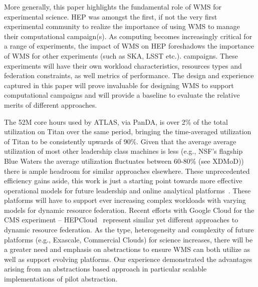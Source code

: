 More generally, this paper highlights the fundamental role of WMS for
experimental science. HEP was amongst the first, if not the very first
experimental community to realize the importance of using WMS to manage their
computational campaign(s). As computing becomes increasingly critical for a
range of experiments, the impact of WMS on HEP foreshadows the importance of
WMS for other experiments (such as SKA, LSST etc.). %
campaigns. These experiments will have their own workload characteristics,
resources types and federation constraints, as well metrics of performance.
The design and experience captured in this paper will prove invaluable for
designing WMS to support computational campaigns and will provide a baseline
to evaluate the relative merits of different approaches.

The 52M core hours used by ATLAS, via PanDA, is over 2\% of the total
utilization on Titan over the same period, bringing the time-averaged
utilization of Titan to be consistently upwards of 90\%. Given that the
average average utilization of most other leadership class machines is less
(e.g., NSF's flagship Blue Waters the average utilization fluctuates between
60-80\% (see XDMoD\cite{bw-sucks})) there is ample headroom for similar
approaches elsewhere. These unprecedented efficiency gains aside, this work is
just a starting point towards more effective operational models for future
leadership and online analytical platforms~\cite{foap-url}. These platforms
will have to support ever increasing complex workloads with varying models for
dynamic resource federation. Recent efforts with Google Cloud for the CMS
experiment -- HEPCloud~\cite{hepcloud,googlehep} represent similar yet
different approaches to dynamic resource federation. As the type,
heterogeneity and complexity of future platforms  (e.g., Exascale, Commercial
Clouds) for science increases, there will be a greater need and emphasis on
abstractions to ensure WMS can both utilize as well as support evolving
platforms. Our experience demonstrated the advantages arising from an
abstractions based approach \textendash{} in particular scalable implementations
of pilot abstraction.
